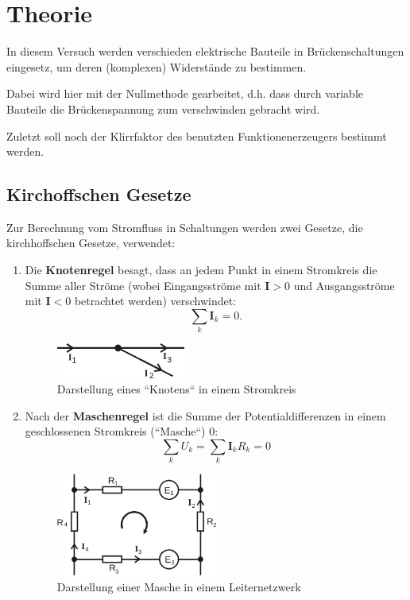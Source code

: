 \section{Theorie}
\label{sec:Theorie}

In diesem Versuch werden verschieden elektrische Bauteile in Brückenschaltungen
eingesetz, um deren (komplexen) Widerstände zu bestimmen.

Dabei wird hier mit der Nullmethode gearbeitet, d.h. dass durch variable Bauteile
die Brückenspannung zum verschwinden gebracht wird.

Zuletzt soll noch der Klirrfaktor des benutzten Funktionenerzeugers bestimmt werden.

\subsection{Kirchoffschen Gesetze}
\label{sec:kirchhoff}
Zur Berechnung vom Stromfluss in Schaltungen werden zwei Gesetze, die
kirchhoffschen Gesetze, verwendet:
\begin{enumerate}
	\item Die \textbf{Knotenregel} besagt, dass an jedem Punkt in einem Stromkreis
		die Summe aller Ströme (wobei Eingangsströme mit $\mathbf{I} > 0$ und
		Ausgangsströme mit $\mathbf{I} < 0$ betrachtet werden) verschwindet:
		\begin{equation}
			\sum_k \mathbf{I}_k = 0.
			\label{eqn:knotenregel}
		\end{equation}
		\begin{figure}[H]
			\centering
			\includegraphics[width=0.4\textwidth]{bilder/knotenregel.png}
			\caption{Darstellung eines ``Knotens`` in einem Stromkreis}
			\label{fig:knotenregel}
		\end{figure}
	\item Nach der \textbf{Maschenregel} ist die Summe der Potentialdifferenzen
		in einem geschlossenen Stromkreis (``Masche``) 0:
		\begin{equation}
			\sum_k U_k = \sum_k \mathbf{I}_k R_k= 0
			\label{eqn:maschenregel}
		\end{equation}
		\begin{figure}[H]
			\centering
			\includegraphics[width=0.5\textwidth]{bilder/maschenregel.png}
			\caption{Darstellung einer Masche in einem Leiternetzwerk}
			\label{fig:maschenregel}
		\end{figure}
\end{enumerate}


